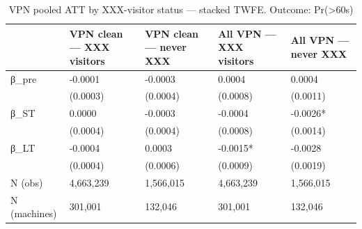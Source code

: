\begin{table}

\caption{VPN pooled ATT by XXX-visitor status — stacked TWFE. Outcome: Pr(>60s)}
\centering
\begin{tabular}[t]{lllll}
\toprule
  & VPN clean — XXX visitors & VPN clean — never XXX & All VPN — XXX visitors & All VPN — never XXX\\
\midrule
β\_pre & -0.0001 & -0.0003 & 0.0004 & 0.0004\\
 & (0.0003) & (0.0004) & (0.0008) & (0.0011)\\
β\_ST & 0.0000 & -0.0003 & -0.0004 & -0.0026*\\
 & (0.0004) & (0.0004) & (0.0008) & (0.0014)\\
β\_LT & -0.0004 & 0.0003 & -0.0015* & -0.0028\\
\addlinespace
 & (0.0004) & (0.0006) & (0.0009) & (0.0019)\\
N (obs) & 4,663,239 & 1,566,015 & 4,663,239 & 1,566,015\\
N (machines) & 301,001 & 132,046 & 301,001 & 132,046\\
\bottomrule
\end{tabular}
\end{table}
